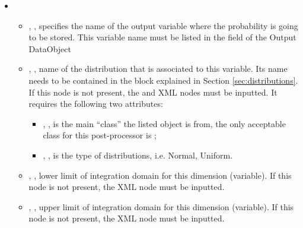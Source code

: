 \begin{itemize}
\item \variableDescription
 \variableChildIntro
 \begin{itemize}
     \item  {}, , specifies the name of the output variable where the probability is going to be stored.
               \nb This variable name must be listed in the  field of the Output DataObject
    \item   {}, , name of the distribution that is associated to this variable.
              Its name needs to be contained in the  block explained
              in Section \ref{sec:distributions}. If this node is not present, the  
              and   XML nodes must be inputted. It requires the following two attributes:
            \begin{itemize}
              \item {}, , is the main
              ``class'' the listed object is from, the only acceptable class for
              this post-processor is ;
              \item {}, , is the type of distributions,
                i.e. Normal, Uniform.
            \end{itemize}
   \item   {}, , lower limit of integration domain for this dimension (variable).
               If this node is not present, the   XML node must be inputted.
   \item   {}, , upper limit of integration domain for this dimension (variable).
               If this node is not present, the   XML node must be inputted.
  \end{itemize}


\end{itemize}
